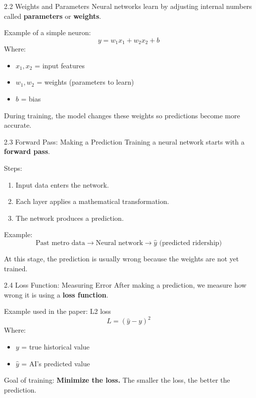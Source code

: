 \documentclass[aspectratio=169]{beamer}
\begin{document}
\begin{frame}{2.2 Weights and Parameters}
    Neural networks learn by adjusting internal numbers called \textbf{parameters} or \textbf{weights}.
    
    \vspace{0.3cm}
    Example of a simple neuron:
    \[
    y = w_1x_1 + w_2x_2 + b
    \]
    Where:
    \begin{itemize}
        \item $x_1, x_2$ = input features
        \item $w_1, w_2$ = weights (parameters to learn)
        \item $b$ = bias
    \end{itemize}
    
    \vspace{0.3cm}
    During training, the model changes these weights so predictions become more accurate.
\end{frame}

\begin{frame}{2.3 Forward Pass: Making a Prediction}
    Training a neural network starts with a \textbf{forward pass}.
    
    Steps:
    \begin{enumerate}
        \item Input data enters the network.
        \item Each layer applies a mathematical transformation.
        \item The network produces a prediction.
    \end{enumerate}
    
    Example:
    \[
    \text{Past metro data} \rightarrow \text{Neural network} \rightarrow \hat{y} \text{ (predicted ridership)}
    \]
    
    At this stage, the prediction is usually wrong because the weights are not yet trained.
\end{frame}

\begin{frame}{2.4 Loss Function: Measuring Error}
    After making a prediction, we measure how wrong it is using a \textbf{loss function}.
    
    \vspace{0.3cm}
    Example used in the paper: L2 loss
    \[
    L = (\hat{y} - y)^2
    \]
    Where:
    \begin{itemize}
        \item $y$ = true historical value
        \item $\hat{y}$ = AI's predicted value
    \end{itemize}
    
    \vspace{0.3cm}
    Goal of training: \textbf{Minimize the loss.} The smaller the loss, the better the prediction.
\end{frame}
\end{document}
